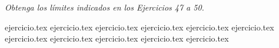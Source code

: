 \noindent \textit{Obtenga los límites indicados en los Ejercicios 47 a 50.}

\begin{enumerate}
    \setcounter{enumi}{46}
    {ejercicio.tex}
    {ejercicio.tex}
    {ejercicio.tex}
    {ejercicio.tex}
    {ejercicio.tex}
    {ejercicio.tex}
    {ejercicio.tex}
    {ejercicio.tex}
    {ejercicio.tex}
    {ejercicio.tex}
    {ejercicio.tex}
\end{enumerate}
